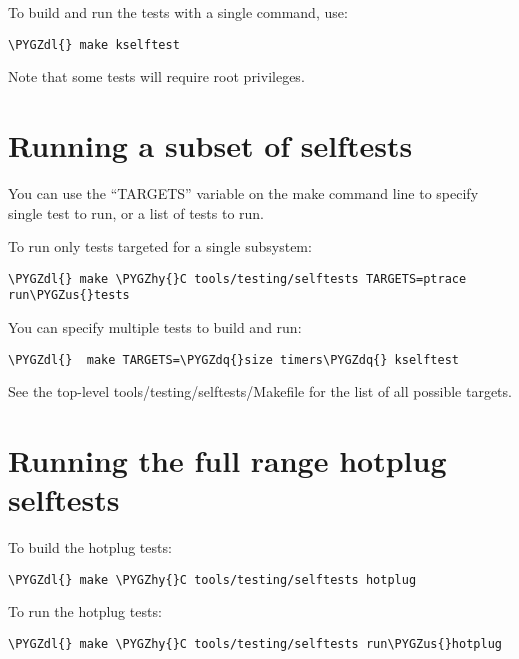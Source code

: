 \documentclass[a4paper,8pt,english]{sphinxmanual}
\def\PYGZus{\char`\_}
\def\PYGZdl{\char`\$}
\def\PYGZhy{\char`\-}
\def\PYGZdq{\char`\"}
\begin{document}
To build and run the tests with a single command, use:

\begin{Verbatim}[commandchars=\\\{\}]
\PYGZdl{} make kselftest
\end{Verbatim}

Note that some tests will require root privileges.


\section{Running a subset of selftests}
\label{dev-tools/kselftest:running-a-subset-of-selftests}
You can use the ``TARGETS'' variable on the make command line to specify
single test to run, or a list of tests to run.

To run only tests targeted for a single subsystem:

\begin{Verbatim}[commandchars=\\\{\}]
\PYGZdl{} make \PYGZhy{}C tools/testing/selftests TARGETS=ptrace run\PYGZus{}tests
\end{Verbatim}

You can specify multiple tests to build and run:

\begin{Verbatim}[commandchars=\\\{\}]
\PYGZdl{}  make TARGETS=\PYGZdq{}size timers\PYGZdq{} kselftest
\end{Verbatim}

See the top-level tools/testing/selftests/Makefile for the list of all
possible targets.


\section{Running the full range hotplug selftests}
\label{dev-tools/kselftest:running-the-full-range-hotplug-selftests}
To build the hotplug tests:

\begin{Verbatim}[commandchars=\\\{\}]
\PYGZdl{} make \PYGZhy{}C tools/testing/selftests hotplug
\end{Verbatim}

To run the hotplug tests:

\begin{Verbatim}[commandchars=\\\{\}]
\PYGZdl{} make \PYGZhy{}C tools/testing/selftests run\PYGZus{}hotplug
\end{Verbatim}
\end{document}
